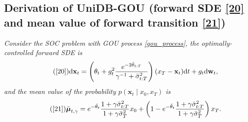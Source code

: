 




\subsection{Derivation of UniDB-GOU (forward SDE \eqref{20} and mean value of forward transition \eqref{21})}\label{proof_derivation_UniDB-GOU}
\noindent \textit{Consider the SOC problem with GOU process \eqref{gou_process}, the optimally-controlled forward SDE is}
\begin{equation}\tag{\ref{20}}
\mathrm{d} \mathbf{x}_t = \left( \theta_t + g^2_t \frac{e^{-2\bar{\theta}_{t:T}}}{\gamma^{-1} + \bar{\sigma}^2_{t:T}}\right) (x_T - \mathbf{x}_t) \mathrm{d} t + g_t \mathrm{d} \mathbf{w}_t,
\end{equation}
\textit{and the mean value of the probability $p(\mathbf{x}_t \mid x_0, x_T)$ is}
\begin{equation}\tag{\ref{21}}
\bar{\boldsymbol{\mu}}_{t, \gamma} = e^{-\bar{\theta}_{t}} \frac{1 + \gamma \bar{\sigma}^2_{t:T}}{1 + \gamma \bar{\sigma}^2_{T}} x_0 + \left(1 - e^{-\bar{\theta}_{t}} \frac{1 + \gamma \bar{\sigma}^2_{t:T}}{1 + \gamma \bar{\sigma}^2_{T}}\right) x_T.
\end{equation}

